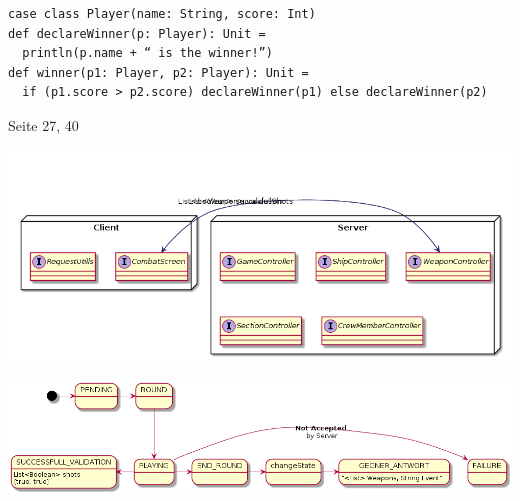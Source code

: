 \documentclass[11pt]{article}
\begin{document}
\begin{verbatim}
case class Player(name: String, score: Int)
def declareWinner(p: Player): Unit =
  println(p.name + “ is the winner!”)
def winner(p1: Player, p2: Player): Unit =
  if (p1.score > p2.score) declareWinner(p1) else declareWinner(p2)
\end{verbatim}

Seite 27, 40



\begin{center}
\includegraphics[width=.9\linewidth]{kommunikation.png}
\end{center}



\begin{center}
\includegraphics[width=.9\linewidth]{combatSequence.png}
\end{center}
\end{document}
